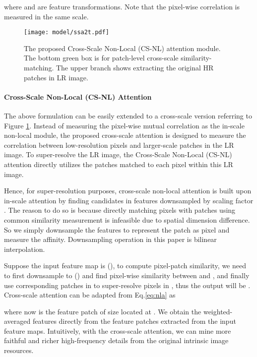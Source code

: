 \documentclass[10pt,twocolumn,letterpaper]{article}
\begin{document}
where  and  are feature transformations. Note that the pixel-wise correlation is measured in the same scale.



\begin{figure}[t]
	\centering
		\texttt{[image: model/ssa2t.pdf]}
	\caption{The proposed Cross-Scale Non-Local (CS-NL) attention module. The bottom green box is for patch-level cross-scale similarity-matching. The upper branch shows extracting the original HR patches in LR image. }
	\label{fig:attention}
\end{figure}

\paragraph{Cross-Scale Non-Local (CS-NL) Attention}



The above formulation can be easily extended to a cross-scale version referring to Figure \ref{fig:attention}. Instead of measuring the pixel-wise mutual correlation as the in-scale non-local module, the proposed cross-scale attention is designed to measure the correlation between low-resolution pixels and larger-scale patches in the LR image. To super-resolve the LR image, the Cross-Scale Non-Local (CS-NL) attention directly utilizes the patches matched to each pixel within this LR image.  







Hence, for super-resolution purposes, cross-scale non-local attention is built upon in-scale attention by finding candidates in features  downsampled by scaling factor . The reason to do so is because directly matching pixels with patches using common similarity measurement is infeasible due to spatial dimension difference. So we simply downsample the features to represent the patch as pixel and measure the affinity. Downsampling operation in this paper is bilinear interpolation.

Suppose the input feature map is  (), to compute pixel-patch similarity, we need to first downsample  to  () and find pixel-wise similarity between  and , and finally use corresponding  patches in  to super-resolve pixels in , thus the output  will be .
Cross-scale attention can be adapted from Eq.\ref{eq:nla} as

where  now is the feature patch of size  located at . We obtain the weighted-averaged features  directly from the feature patches  extracted from the input feature maps. Intuitively, with the cross-scale attention, we can mine more faithful and richer high-frequency details from the original intrinsic image resources.
\end{document}
